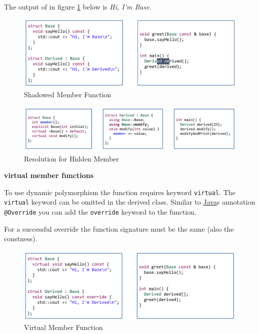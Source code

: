 \documentclass[11pt,twoside,landscape]{article}
\begin{document}
\begin{multicols}{3}
The output of in figure \ref{fig:org501f6f4}  below is \emph{Hi, I'm Base}.


\begin{figure}[htbp]
\centering
\includegraphics[width=.9\linewidth]{img/shadowing_member_functions.png}
\caption{\label{fig:org501f6f4}Shadowed Member Function}
\end{figure}


\begin{figure}[htbp]
\centering
\includegraphics[width=.9\linewidth]{img/shadowing_member_functions_using.png}
\caption{\label{fig:orgf1e865e}Resolution for Hidden Member}
\end{figure}

\textbf{virtual member functions}

To use dynamic polymorphism the function requires keyword \texttt{virtual}.
The \texttt{virtual} keyword can be omitted in the derived class.
Similar to \href{../../../roam/20201116150053-java.org}{Java}s annotation \texttt{@Override} you can add the \texttt{override} keyword to the function.

For a successful override the function signature must be the same (also the constness).

\begin{figure}[htbp]
\centering
\includegraphics[width=.9\linewidth]{img/virtual_member_function.png}
\caption{Virtual Member Function}
\end{figure}


\end{multicols}
\end{document}
